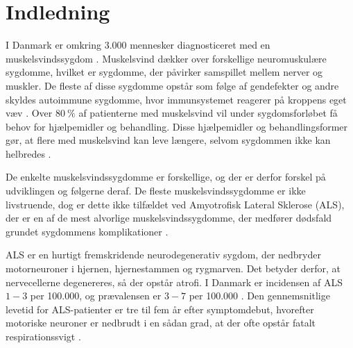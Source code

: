 \chapter{Indledning} \label{sec:indledning}



I Danmark er omkring 3.000 mennesker diagnosticeret med en muskelsvindssygdom \citep{universitet2013}. Muskelsvind dækker over forskellige neuromuskulære sygdomme, hvilket er sygdomme, der påvirker samspillet mellem nerver og muskler. De fleste af disse sygdomme opstår som følge af gendefekter og andre skyldes autoimmune sygdomme, hvor immunsystemet reagerer på kroppens eget væv \citep{arahata2014}. Over $80~\%$ af patienterne med muskelsvind vil under sygdomsforløbet få behov for hjælpemidler og behandling. Disse hjælpemidler og behandlingsformer gør, at flere med muskelsvind kan leve længere, selvom sygdommen ikke kan helbredes \citep{hvadermuskelsvind2016}. 

De enkelte muskelsvindssygdomme er forskellige, og der er derfor forskel på udviklingen og følgerne deraf. De fleste muskelsvindssygdomme er ikke livstruende, dog er dette ikke tilfældet ved Amyotrofisk Lateral Sklerose (ALS), der er en af de mest alvorlige muskelsvindssygdomme, der medfører dødsfald grundet sygdommens komplikationer \citep{henschke2012}. 

ALS er en hurtigt fremskridende neurodegenerativ sygdom, der nedbryder motorneuroner i hjernen, hjernestammen og rygmarven. Det betyder derfor, at nervecellerne degenereres, så der opstår atrofi. I Danmark er incidensen af ALS $1-3$ per 100.000, og prævalensen er $3-7$ per 100.000 \citep{russell2015}. Den gennemsnitlige levetid for ALS-patienter er tre til fem år efter symptomdebut, hvorefter motoriske neuroner er nedbrudt i en sådan grad, at der ofte opstår fatalt respirationssvigt \citep{grehl2011, morris2015}.

